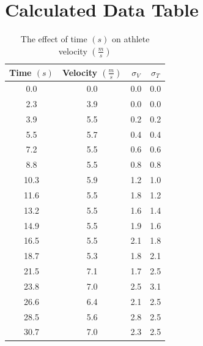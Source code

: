 \documentclass[index]{subfiles}
\begin{document}
\section{Calculated Data Table}

\begin{table}[H]
    \centering
    \caption{The effect of time \((s)\) on athlete velocity \((\frac{m}{s})\)}
    \begin{tabular}{@{}cccc@{}} \toprule
        {Time \((s)\)} & {Velocity \((\frac{m}{s})\)} & {\(\sigma_{V}\)} & {\(\sigma_{T}\)} \\ \midrule
        0.0            & 0.0                          & 0.0              & 0.0              \\
        2.3            & 3.9                          & 0.0              & 0.0              \\
        3.9            & 5.5                          & 0.2              & 0.2              \\
        5.5            & 5.7                          & 0.4              & 0.4              \\
        7.2            & 5.5                          & 0.6              & 0.6              \\
        8.8            & 5.5                          & 0.8              & 0.8              \\
        10.3           & 5.9                          & 1.2              & 1.0              \\
        11.6           & 5.5                          & 1.8              & 1.2              \\
        13.2           & 5.5                          & 1.6              & 1.4              \\
        14.9           & 5.5                          & 1.9              & 1.6              \\
        16.5           & 5.5                          & 2.1              & 1.8              \\
        18.7           & 5.3                          & 1.8              & 2.1              \\
        21.5           & 7.1                          & 1.7              & 2.5              \\
        23.8           & 7.0                          & 2.5              & 3.1              \\
        26.6           & 6.4                          & 2.1              & 2.5              \\
        28.5           & 5.6                          & 2.8              & 2.5              \\
        30.7           & 7.0                          & 2.3              & 2.5
    \end{tabular}
\end{table}
\end{document}
